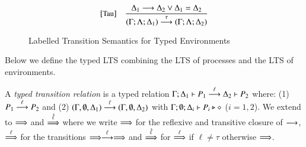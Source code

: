 \begin{figure}[t]
\[\begin{array}{lc}
{		}
		\\[8mm]
		\eltsrule{Tau}&\tree{
			\Delta_1 \red \Delta_2 \vee \Delta_1 = \Delta_2
		}{
			(\Gamma; \Lambda; \Delta_1) \by{\tau} (\Gamma; \Lambda; \Delta_2)
		}
	\end{array}
	\]
\caption{Labelled Transition Semantics for Typed Environments 
\label{fig:envLTS}}
\Hline
\end{figure}

Below we define the typed LTS combining 
the LTS of processes and the LTS of environments. 

\smallskip

\begin{definition}\label{d:tlts}\rm
A {\em typed transition relation} is a typed relation
$\Gamma; \Delta_1 \vdash P_1 \stackrel{\ell}{\longrightarrow} \Delta_2 \vdash P_2$
	where:
%
(1) $P_1 \stackrel{\ell}{\longrightarrow} P_2$ and (2) 
$(\Gamma, \emptyset, \Delta_1) \stackrel{\ell}{\longrightarrow} (\Gamma, \emptyset, \Delta_2)$ 
with $\Gamma; \emptyset; \Delta_i \vdash P_i \triangleright \diamond$ 
($i=1,2$). 
%
%
We extend to $\stackrel{}{\Longrightarrow}$ 
and $\stackrel{\hat{\ell}}{\Longrightarrow}$ 
where we write 
$\stackrel{}{\Longrightarrow}$ for the reflexive and
transitive closure of $\stackrel{}{\longrightarrow}$, $\stackrel{\ell}{\Longrightarrow}$ for the transitions
$\stackrel{}{\Longrightarrow}\stackrel{\ell}{\longrightarrow}\stackrel{}{\Longrightarrow}$ and $\stackrel{\hat{\ell}}{\Longrightarrow}$ for $\stackrel{\ell}{\Longrightarrow}$ if
$\ell\not = \tau$ otherwise $\stackrel{}{\Longrightarrow}$. 
\end{definition}

